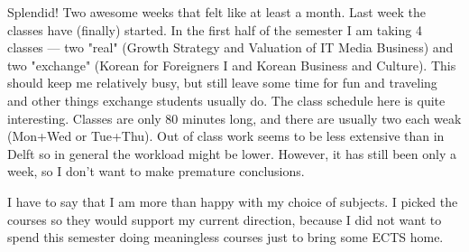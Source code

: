 
\begin{post}
	\begin{content}
Splendid! Two awesome weeks that felt like at least a month. Last week the classes have (finally) started. In the first half of the semester I am taking 4 classes — two "real" (Growth Strategy and Valuation of IT Media Business) and two "exchange" (Korean for Foreigners I and Korean Business and Culture). This should keep me relatively busy, but still leave some time for fun and traveling and other things exchange students usually do. The class schedule here is quite interesting. Classes are only 80 minutes long, and there are usually two each weak (Mon+Wed or Tue+Thu). Out of class work seems to be less extensive than in Delft so in general the workload might be lower. However, it has still been only a week, so I don't want to make premature conclusions.

I have to say that I am more than happy with my choice of subjects. I picked the courses so they would support my current direction, because I did not want to spend this semester doing meaningless courses just to bring some ECTS home.



\end{content}
\end{post}
